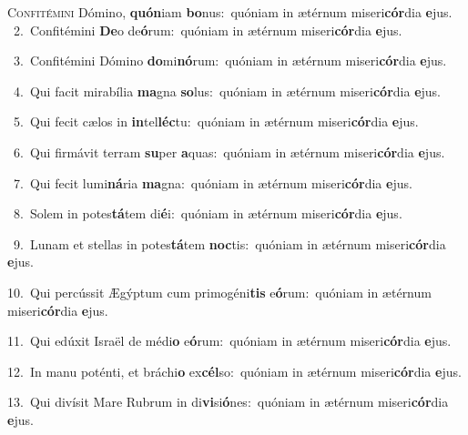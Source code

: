 \lettrine{\initial\textcolor{\initialcolor}{C}}{onfitémini} Dómino, \textbf{quón}\-iam \textbf{bo}\-nus:~\star quóniam in ætérnum miseri\-\textbf{cór}\-dia \textbf{e}\-jus.\\
{\numbfont\textcolor{\numbcolor}{~2.}}~Confitémini \textbf{De}\-o de\-\textbf{ó}\-rum:~\star quóniam in ætérnum miseri\-\textbf{cór}\-dia \textbf{e}\-jus.\par
{\numbfont\textcolor{\numbcolor}{~3.}}~Confitémini Dómino \textbf{do}\-mi\-\textbf{nó}\-rum:~\star quóniam in ætérnum miseri\-\textbf{cór}\-dia \textbf{e}\-jus.\par
{\numbfont\textcolor{\numbcolor}{~4.}}~Qui facit mirabília \textbf{ma}\-gna \textbf{so}\-lus:~\star quóniam in ætérnum miseri\-\textbf{cór}\-dia \textbf{e}\-jus.\par
{\numbfont\textcolor{\numbcolor}{~5.}}~Qui fecit cælos in \textbf{in}\-tel\-\textbf{léc}\-tu:~\star quóniam in ætérnum miseri\-\textbf{cór}\-dia \textbf{e}\-jus.\par
{\numbfont\textcolor{\numbcolor}{~6.}}~Qui firmávit terram \textbf{su}\-per \textbf{a}\-quas:~\star quóniam in ætérnum miseri\-\textbf{cór}\-dia \textbf{e}\-jus.\par
{\numbfont\textcolor{\numbcolor}{~7.}}~Qui fecit lumi\-\textbf{ná}\-ria \textbf{ma}\-gna:~\star quóniam in ætérnum miseri\-\textbf{cór}\-dia \textbf{e}\-jus.\par
{\numbfont\textcolor{\numbcolor}{~8.}}~Solem in potes\-\textbf{tá}\-tem di\-\textbf{é}\-i:~\star quóniam in ætérnum miseri\-\textbf{cór}\-dia \textbf{e}\-jus.\par
{\numbfont\textcolor{\numbcolor}{~9.}}~Lunam et stellas in potes\-\textbf{tá}\-tem \textbf{noc}\-tis:~\star quóniam in ætérnum miseri\-\textbf{cór}\-dia \textbf{e}\-jus.\par
{\numbfont\textcolor{\numbcolor}{10.}}~Qui percússit Ægýptum cum primogéni\textbf{tis} e\-\textbf{ó}\-rum:~\star quóniam in ætérnum miseri\-\textbf{cór}\-dia \textbf{e}\-jus.\par
{\numbfont\textcolor{\numbcolor}{11.}}~Qui edúxit Israël de médi\textbf{o} e\-\textbf{ó}\-rum:~\star quóniam in ætérnum miseri\-\textbf{cór}\-dia \textbf{e}\-jus.\par
{\numbfont\textcolor{\numbcolor}{12.}}~In manu poténti, et bráchi\textbf{o} ex\-\textbf{cél}\-so:~\star quóniam in ætérnum miseri\-\textbf{cór}\-dia \textbf{e}\-jus.\par
{\numbfont\textcolor{\numbcolor}{13.}}~Qui divísit Mare Rubrum in di\-\textbf{vi}\-si\-\textbf{ó}\-nes:~\star quóniam in ætérnum miseri\-\textbf{cór}\-dia \textbf{e}\-jus.\par
